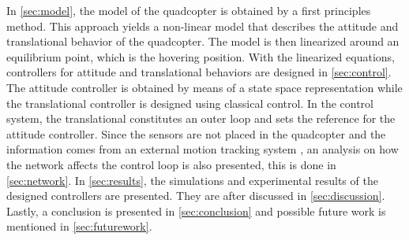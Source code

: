 In \autoref{sec:model}, the model of the quadcopter is obtained by a first principles method. This approach yields a non-linear model that describes the attitude and translational behavior of the quadcopter. The model is then linearized around an equilibrium point, which is the hovering position. 
%
With the linearized equations, controllers for attitude and translational behaviors are designed in \autoref{sec:control}. The attitude controller is obtained by means of a state space representation while the translational controller is designed using classical control. In the control system, the translational constitutes an outer loop and sets the reference for the attitude controller.
%
Since the sensors are not placed in the quadcopter and the information comes from an external motion tracking system \cite{vicon}, an analysis on how the network affects the control loop is also presented, this is done in \autoref{sec:network}.
%
In \autoref{sec:results}, the simulations and experimental results of the designed controllers are presented. They are after discussed in \autoref{sec:discussion}. Lastly, a conclusion is presented in \autoref{sec:conclusion} and possible future work is mentioned in \autoref{sec:futurework}. 